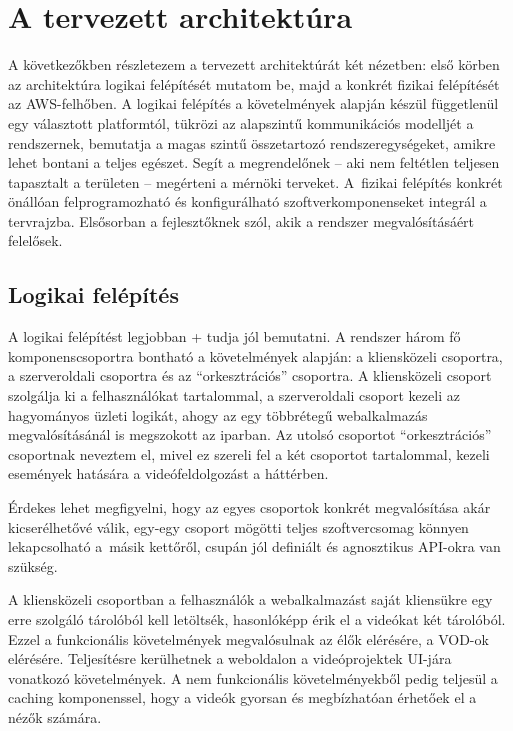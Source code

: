 \chapter{A tervezett architektúra}

A következőkben részletezem a tervezett architektúrát két nézetben: első körben az architektúra logikai felépítését mutatom be, majd a konkrét fizikai felépítését az AWS-felhőben. A logikai felépítés a követelmények alapján készül függetlenül egy választott platformtól, tükrözi az alapszintű kommunikációs modelljét a rendszernek, bemutatja a magas szintű összetartozó rendszeregységeket, amikre lehet bontani a teljes egészet. Segít a megrendelőnek -- aki nem feltétlen teljesen tapasztalt a területen -- megérteni a mérnöki terveket. A~fizikai felépítés konkrét önállóan felprogramozható és konfigurálható szoftverkomponenseket integrál a tervrajzba. Elsősorban a fejlesztőknek szól, akik a rendszer megvalósításáért felelősek.

\section{Logikai felépítés}

A logikai felépítést legjobban \az+ tudja jól bemutatni. A rendszer három fő komponenscsoportra bontható a követelmények alapján: a kliensközeli csoportra, a szerveroldali csoportra és az ``orkesztrációs'' csoportra. A kliensközeli csoport szolgálja ki a felhasználókat tartalommal, a szerveroldali csoport kezeli az hagyományos üzleti logikát, ahogy az egy többrétegű webalkalmazás megvalósításánál is megszokott az iparban. Az utolsó csoportot ``orkesztrációs'' csoportnak neveztem el, mivel ez szereli fel a két csoportot tartalommal, kezeli események hatására a videófeldolgozást a háttérben.

Érdekes lehet megfigyelni, hogy az egyes csoportok konkrét megvalósítása akár kicserélhetővé válik, egy-egy csoport mögötti teljes szoftvercsomag könnyen lekapcsolható a~másik kettőről, csupán jól definiált és agnosztikus API-okra van szükség.

A kliensközeli csoportban a felhasználók a webalkalmazást saját kliensükre egy erre szolgáló tárolóból kell letöltsék, hasonlóképp érik el a videókat két tárolóból. Ezzel a funkcionális követelmények megvalósulnak az élők elérésére, a VOD-ok elérésére. Teljesítésre kerülhetnek a weboldalon a videóprojektek UI-jára vonatkozó követelmények. A nem funkcionális követelményekből pedig teljesül a caching komponenssel, hogy a videók gyorsan és megbízhatóan érhetőek el a nézők számára.

